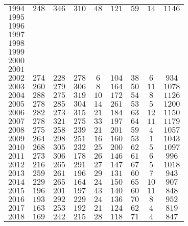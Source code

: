 \begin{longtable}{|l|cccccccc|}
    $1994$  & $248$ & $346$ & $310$ & $48$  & $121$ & $59$  & $14$  & $1146$ \\
    $1995$  &       &       &       &       &       &       &       &       \\
    $1996$  &       &       &       &       &       &       &       &       \\
    $1997$  &       &       &       &       &       &       &       &       \\
    $1998$  &       &       &       &       &       &       &       &       \\
    $1999$  &       &       &       &       &       &       &       &       \\
    $2000$  &       &       &       &       &       &       &       &       \\
    $2001$  &       &       &       &       &       &       &       &       \\
    $2002$  & $274$ & $228$ & $278$ & $6$   & $104$ & $38$  & $6$   & $934$ \\
    $2003$  & $260$ & $279$ & $306$ & $8$   & $164$ & $50$  & $11$  & $1078$ \\
    $2004$  & $288$ & $275$ & $319$ & $10$  & $172$ & $54$  & $8$   & $1126$ \\
    $2005$  & $278$ & $285$ & $304$ & $14$  & $261$ & $53$  & $5$   & $1200$ \\
    $2006$  & $282$ & $273$ & $315$ & $21$  & $184$ & $63$  & $12$  & $1150$ \\
    $2007$  & $278$ & $321$ & $275$ & $33$  & $197$ & $64$  & $11$  & $1179$ \\
    $2008$  & $275$ & $258$ & $239$ & $21$  & $201$ & $59$  & $4$   & $1057$ \\
    $2009$  & $264$ & $298$ & $251$ & $16$  & $160$ & $53$  & $1$   & $1043$ \\
    $2010$  & $268$ & $305$ & $232$ & $25$  & $200$ & $62$  & $5$   & $1097$ \\
    $2011$  & $273$ & $306$ & $178$ & $26$  & $146$ & $61$  & $6$   & $996$ \\
    $2012$  & $216$ & $265$ & $291$ & $27$  & $147$ & $67$  & $5$   & $1018$ \\
    $2013$  & $259$ & $261$ & $196$ & $29$  & $131$ & $60$  & $7$   & $943$ \\
    $2014$  & $229$ & $265$ & $164$ & $24$  & $150$ & $65$  & $10$  & $907$ \\
    $2015$  & $196$ & $201$ & $197$ & $43$  & $140$ & $60$  & $11$  & $848$ \\
    $2016$  & $193$ & $292$ & $229$ & $24$  & $136$ & $70$  & $8$   & $952$ \\
    $2017$  & $163$ & $253$ & $192$ & $21$  & $124$ & $62$  & $4$   & $819$ \\
    $2018$  & $169$ & $242$ & $215$ & $28$  & $118$ & $71$  & $4$   & $847$ \\
\hline
\end{longtable}

\begin{landscape}
\begin{figure}[H]
\centering
\end{figure}
\end{landscape}
